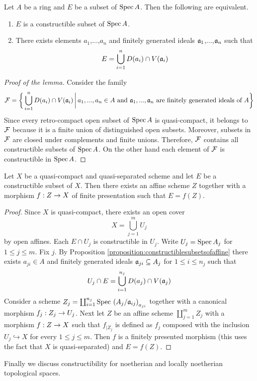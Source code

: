 \begin{proposition}\label{proposition:constructiblesubsetsofaffine}
Let $A$ be a ring and $E$ be a subset of $\mathrm{Spec}\, A$. Then the following are equivalent.
\begin{enumerate}[label=\emph{\textbf{(\roman*)}}, leftmargin=*]
\item $E$ is a constructible subset of $\mathrm{Spec}\, A$.
\item There exists elements $a_1$,...,$a_n$ and finitely generated ideals $\mathfrak{a}_1$,...,$\mathfrak{a}_n$ such that
$$E = \bigcup_{i=1}^nD(a_i)\cap V(\mathfrak{a}_i)$$
\end{enumerate}
\end{proposition}
\begin{proof}[Proof of the lemma]
Consider the family 
$${\mathcal F} = \bigg\{\bigcup_{i=1}^nD(a_i)\cap V(\mathfrak{a}_i)\,\bigg|\,a_1,...,a_n\in A\mbox{ and }\mathfrak{a}_1,...,\mathfrak{a}_n\mbox{ are finitely generated ideals of }A\bigg\}$$
Since every retro-compact open subset of $\mathrm{Spec}\, A$ is quasi-compact, it belongs to ${\mathcal F}$ because it is a finite union of distinguished open subsets. Moreover, subsets in ${\mathcal F}$ are closed under complements and finite unions. Therefore, ${\mathcal F}$ contains all constructible subsets of $\mathrm{Spec}\, A$. On the other hand each element of ${\mathcal F}$ is constructible in $\mathrm{Spec}\, A$.
\end{proof}

\begin{corollary}\label{corollary:constructibleasimage}
Let $X$ be a quasi-compact and quasi-separated scheme and let $E$ be a constructible subset of $X$. Then there exists an affine scheme $Z$ together with a morphism $f:Z\rightarrow X$ of finite presentation such that $E = f(Z)$. 
\end{corollary}
\begin{proof}
Since $X$ is quasi-compact, there exists an open cover 
$$X = \bigcup_{j=1}^mU_j$$
by open affines. Each $E\cap U_j$ is constructible in $U_j$. Write $U_j = \mathrm{Spec}\, A_j$ for $1\leq j\leq m$. Fix $j$. By Proposition \ref{proposition:constructiblesubsetsofaffine} there exists $a_{ji}\in A$ and finitely generated ideals $\mathfrak{a}_{ji}\subseteq A_j$ for $1\leq i\leq n_j$ such that
$$U_j\cap E = \bigcup_{i=1}^{n_j}D(a_j)\cap V(\mathfrak{a}_j)$$
Consider a scheme $Z_j = \coprod_{i=1}^{n_j}\mathrm{Spec}\, \left(A_j/\mathfrak{a}_{ij}\right)_{a_{ji}}$ together with a canonical morphism $f_j:Z_j\rightarrow U_j$. Next let $Z$ be an affine scheme $\coprod_{j=1}^mZ_j$ with a morphism $f:Z\rightarrow X$ such that $f_{\mid Z_j}$ is defined as $f_j$ composed with the inclusion $U_j\hookrightarrow X$ for every $1\leq j\leq m$. Then $f$ is a finitely presented morphism (this uses the fact that $X$ is quasi-separated) and $E = f(Z)$. 
\end{proof}
\noindent
Finally we discuss constructibility for noetherian and locally noetherian topological spaces. 

